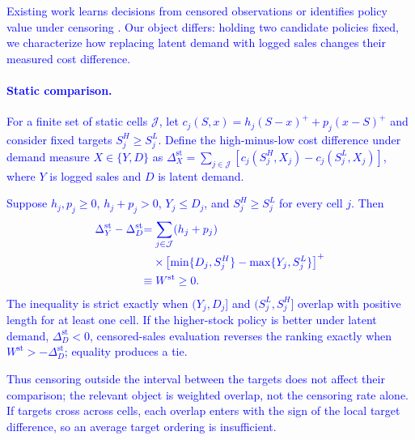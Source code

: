 \documentclass[msom,dblanonrev]{informs4}
\newcommand{\add}[1]{\textcolor{blue}{#1}}
\begin{document}
\add{Existing work learns decisions from censored observations or identifies policy value under censoring \citep{ShiChenDuenyas2016,TangEtAl2025}.}
\add{Our object differs: holding two candidate policies fixed, we characterize how replacing latent demand with logged sales changes their measured cost difference.}

\paragraph{\add{Static comparison.}}
\add{For a finite set of static cells $\mathcal J$, let $c_j(S,x)=h_j(S-x)^++p_j(x-S)^+$ and consider fixed targets $S_j^H\geq S_j^L$. Define the high-minus-low cost difference under demand measure $X\in\{Y,D\}$ as $\Delta_X^{\mathrm{st}}=\sum_{j\in\mathcal J}[c_j(S_j^H,X_j)-c_j(S_j^L,X_j)]$, where $Y$ is logged sales and $D$ is latent demand.}

\begin{proposition}[\add{Static policy-dependent censoring wedge}]\label{prop:censoring-wedge}
\add{Suppose $h_j,p_j\geq0$, $h_j+p_j>0$, $Y_j\leq D_j$, and $S_j^H\geq S_j^L$ for every cell $j$. Then}
\begin{equation}\label{eq:static-censoring-wedge}
\begin{aligned}
\add{\Delta_Y^{\mathrm{st}}-\Delta_D^{\mathrm{st}}}
&\add{=\sum_{j\in\mathcal J}(h_j+p_j)}\\
&\quad\add{\times\left[\min\{D_j,S_j^H\}-\max\{Y_j,S_j^L\}\right]^+}\\
&\add{\equiv W^{\mathrm{st}}\geq0.}
\end{aligned}
\end{equation}
\add{The inequality is strict exactly when $(Y_j,D_j]$ and $(S_j^L,S_j^H]$ overlap with positive length for at least one cell. If the higher-stock policy is better under latent demand, $\Delta_D^{\mathrm{st}}<0$, censored-sales evaluation reverses the ranking exactly when $W^{\mathrm{st}}> -\Delta_D^{\mathrm{st}}$; equality produces a tie.}
\end{proposition}

\add{Thus censoring outside the interval between the targets does not affect their comparison; the relevant object is weighted overlap, not the censoring rate alone. If targets cross across cells, each overlap enters with the sign of the local target difference, so an average target ordering is insufficient.}
\end{document}
